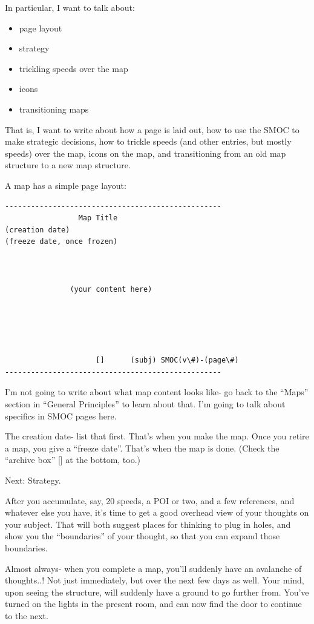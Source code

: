 \documentclass[oneside]{book}
\begin{document}
In particular, I want to talk about:

\begin{itemize}
\item page layout
\item strategy
\item trickling speeds over the map
\item icons
\item transitioning maps
\end{itemize}

That is, I want to write about how a page is laid out, how to use the
SMOC to make strategic decisions, how to trickle speeds (and other
entries, but mostly speeds) over the map, icons on the map, and
transitioning from an old map structure to a new map structure.

A map has a simple page layout:

\begin{verbatim}
--------------------------------------------------
                 Map Title
(creation date)
(freeze date, once frozen)



               (your content here)





                     []      (subj) SMOC(v\#)-(page\#)
--------------------------------------------------
\end{verbatim}

I'm not going to write about what map content looks like- go back to
the ``Maps'' section in ``General Principles'' to learn about that. I'm
going to talk about specifics in SMOC pages here.

The creation date- list that first. That's when you make the map. Once
you retire a map, you give a ``freeze date''. That's when the map is
done. (Check the ``archive box'' [] at the bottom, too.)


Next: Strategy.

After you accumulate, say, 20 speeds, a POI or two, and a few
references, and whatever else you have, it's time to get a good
overhead view of your thoughts on your subject. That will both suggest
places for thinking to plug in holes, and show you the ``boundaries'' of
your thought, so that you can expand those boundaries.

Almost always- when you complete a map, you'll suddenly have an
avalanche of thoughts..! Not just immediately, but over the next few
days as well. Your mind, upon seeing the structure, will suddenly have
a ground to go further from. You've turned on the lights in the
present room, and can now find the door to continue to the next.
\end{document}
